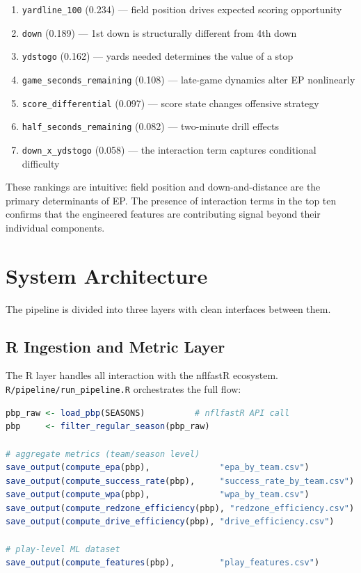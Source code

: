 \documentclass[11pt]{article}
\begin{document}
\begin{enumerate}
  \item \texttt{yardline\_100} (0.234) --- field position drives expected scoring opportunity
  \item \texttt{down} (0.189) --- 1st down is structurally different from 4th down
  \item \texttt{ydstogo} (0.162) --- yards needed determines the value of a stop
  \item \texttt{game\_seconds\_remaining} (0.108) --- late-game dynamics alter EP nonlinearly
  \item \texttt{score\_differential} (0.097) --- score state changes offensive strategy
  \item \texttt{half\_seconds\_remaining} (0.082) --- two-minute drill effects
  \item \texttt{down\_x\_ydstogo} (0.058) --- the interaction term captures conditional difficulty
\end{enumerate}

These rankings are intuitive: field position and down-and-distance are the primary
determinants of EP. The presence of interaction terms in the top ten confirms that
the engineered features are contributing signal beyond their individual components.

\section{System Architecture}
\label{sec:system}

The pipeline is divided into three layers with clean interfaces between them.

\subsection{R Ingestion and Metric Layer}

The R layer handles all interaction with the nflfastR ecosystem.
\texttt{R/pipeline/run\_pipeline.R} orchestrates the full flow:

\begin{lstlisting}[language=R, caption={run\_pipeline.R structure}]
pbp_raw <- load_pbp(SEASONS)          # nflfastR API call
pbp     <- filter_regular_season(pbp_raw)

# aggregate metrics (team/season level)
save_output(compute_epa(pbp),              "epa_by_team.csv")
save_output(compute_success_rate(pbp),     "success_rate_by_team.csv")
save_output(compute_wpa(pbp),              "wpa_by_team.csv")
save_output(compute_redzone_efficiency(pbp), "redzone_efficiency.csv")
save_output(compute_drive_efficiency(pbp), "drive_efficiency.csv")

# play-level ML dataset
save_output(compute_features(pbp),         "play_features.csv")
\end{lstlisting}
\end{document}
